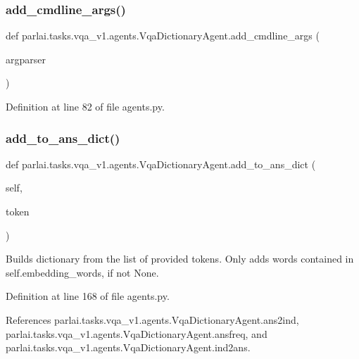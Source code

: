 \subsubsection{\texorpdfstring{add\+\_\+cmdline\+\_\+args()}{add\_cmdline\_args()}}
{\footnotesize\ttfamily def parlai.\+tasks.\+vqa\+\_\+v1.\+agents.\+Vqa\+Dictionary\+Agent.\+add\+\_\+cmdline\+\_\+args (\begin{DoxyParamCaption}\item[{}]{argparser }\end{DoxyParamCaption})\hspace{0.3cm}{\ttfamily [static]}}



Definition at line 82 of file agents.\+py.

\mbox{\label{classparlai_1_1tasks_1_1vqa__v1_1_1agents_1_1VqaDictionaryAgent_a5a69f09a3f7a908c3e89f9b0b86f7396}} 
\subsubsection{\texorpdfstring{add\+\_\+to\+\_\+ans\+\_\+dict()}{add\_to\_ans\_dict()}}
{\footnotesize\ttfamily def parlai.\+tasks.\+vqa\+\_\+v1.\+agents.\+Vqa\+Dictionary\+Agent.\+add\+\_\+to\+\_\+ans\+\_\+dict (\begin{DoxyParamCaption}\item[{}]{self,  }\item[{}]{token }\end{DoxyParamCaption})}

\begin{DoxyVerb}Builds dictionary from the list of provided tokens.
Only adds words contained in self.embedding_words, if not None.
\end{DoxyVerb}
 

Definition at line 168 of file agents.\+py.



References parlai.\+tasks.\+vqa\+\_\+v1.\+agents.\+Vqa\+Dictionary\+Agent.\+ans2ind, parlai.\+tasks.\+vqa\+\_\+v1.\+agents.\+Vqa\+Dictionary\+Agent.\+ansfreq, and parlai.\+tasks.\+vqa\+\_\+v1.\+agents.\+Vqa\+Dictionary\+Agent.\+ind2ans.



